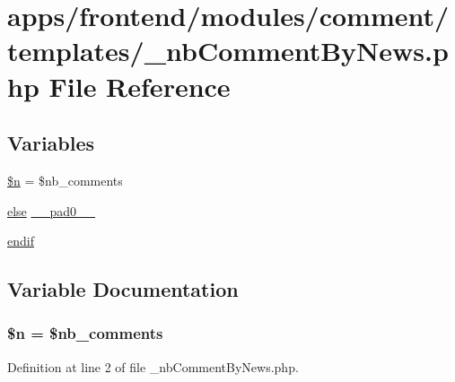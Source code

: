 \hypertarget{frontend_2modules_2comment_2templates_2__nb_comment_by_news_8php}{\section{apps/frontend/modules/comment/templates/\-\_\-nb\-Comment\-By\-News.php File Reference}
\label{frontend_2modules_2comment_2templates_2__nb_comment_by_news_8php}
}
\subsection*{Variables}
\begin{DoxyCompactItemize}
\item 
\hyperlink{frontend_2modules_2comment_2templates_2__nb_comment_by_news_8php_aa5fae90470d460a65d5211ec08e6b05c}{\$n} = \$nb\-\_\-comments
\item 
\hyperlink{live_2modules_2team_2templates_2management_success_8php_a0544c3fe466e421738dae463968b70ba}{else} \hyperlink{frontend_2modules_2comment_2templates_2__nb_comment_by_news_8php_a8e01dcc96c43199448ee66f7c2ae8ea6}{\-\_\-\-\_\-pad0\-\_\-\-\_\-}
\item 
\hyperlink{frontend_2modules_2comment_2templates_2__nb_comment_by_news_8php_a82cd33ca97ff99f2fcc5e9c81d65251b}{endif}
\end{DoxyCompactItemize}


\subsection{Variable Documentation}
\hypertarget{frontend_2modules_2comment_2templates_2__nb_comment_by_news_8php_aa5fae90470d460a65d5211ec08e6b05c}{
\subsubsection[{\$n}]{\setlength{\rightskip}{0pt plus 5cm}\$n = \$nb\-\_\-comments}}\label{frontend_2modules_2comment_2templates_2__nb_comment_by_news_8php_aa5fae90470d460a65d5211ec08e6b05c}


Definition at line 2 of file \-\_\-nb\-Comment\-By\-News.\-php.

